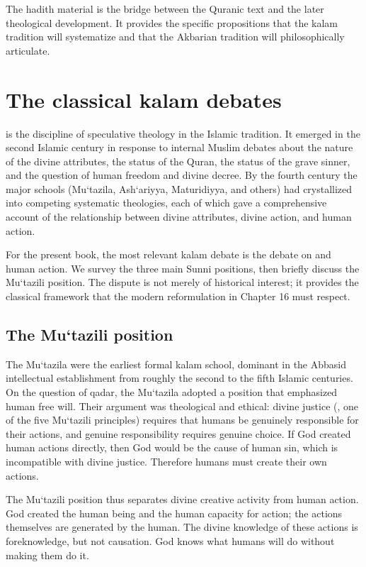The hadith material is the bridge between the Quranic text and the
later theological development. It provides the specific propositions
that the kalam tradition will systematize and that the Akbarian
tradition will philosophically articulate.

\section{The classical kalam debates}
\label{sec:kalam}

 is the discipline of speculative theology in the
Islamic tradition. It emerged in the second Islamic century in
response to internal Muslim debates about the nature of the divine
attributes, the status of the Quran, the status of the grave sinner,
and the question of human freedom and divine decree. By the fourth
century the major schools (Mu`tazila, Ash`ariyya, Maturidiyya, and
others) had crystallized into competing systematic theologies, each
of which gave a comprehensive account of the relationship between
divine attributes, divine action, and human action.

For the present book, the most relevant kalam debate is the debate
on  and human action. We survey the three main Sunni
positions, then briefly discuss the Mu`tazili position. The dispute
is not merely of historical interest; it provides the classical
framework that the modern reformulation in Chapter 16 must respect.

\subsection{The Mu`tazili position}

The Mu`tazila were the earliest formal kalam school, dominant in the
Abbasid intellectual establishment from roughly the second to the
fifth Islamic centuries. On the question of qadar, the Mu`tazila
adopted a position that emphasized human free will. Their argument
was theological and ethical: divine justice (, one of
the five Mu`tazili principles) requires that humans be genuinely
responsible for their actions, and genuine responsibility requires
genuine choice. If God created human actions directly, then God would
be the cause of human sin, which is incompatible with divine
justice. Therefore humans must create their own actions.

The Mu`tazili position thus separates divine creative activity from
human action. God created the human being and the human capacity for
action; the actions themselves are generated by the human. The
divine knowledge of these actions is foreknowledge, but not
causation. God knows what humans will do without making them do it.

